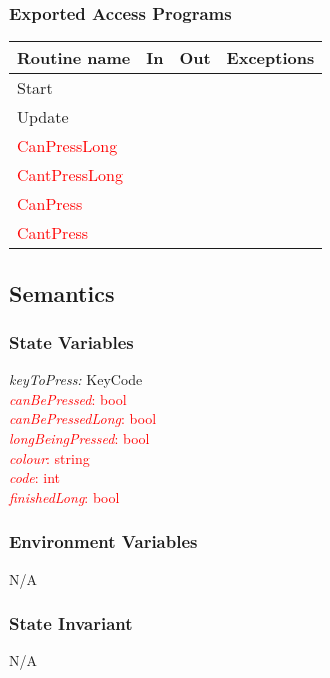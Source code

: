 \documentclass[12pt]{article}
\begin{document}
\subsubsection {Exported Access Programs}

\begin{tabular}{| l | l | l | l |}
\hline
\textbf{Routine name} & \textbf{In} & \textbf{Out} & \textbf{Exceptions}\\
\hline
Start       &           &           &           \\
\hline
Update       &           &           &          \\
\hline
\textcolor{red}{CanPressLong}       &           &           &          \\
\hline
\textcolor{red}{CantPressLong}       &           &           &          \\
\hline
\textcolor{red}{CanPress}       &           &           &          \\
\hline
\textcolor{red}{CantPress}       &           &           &          \\
\hline
\end{tabular}

\subsection {Semantics}

\subsubsection {State Variables}

\textit{keyToPress:} KeyCode \\
\textcolor{red}{\textit{canBePressed}: bool\\
\textit{canBePressedLong}: bool\\
\textit{longBeingPressed}: bool\\
\textit{colour}: string\\
\textit{code}: int\\
\textit{finishedLong}: bool}

\subsubsection {Environment Variables}

N/A

\subsubsection {State Invariant}
N/A
\end{document}
